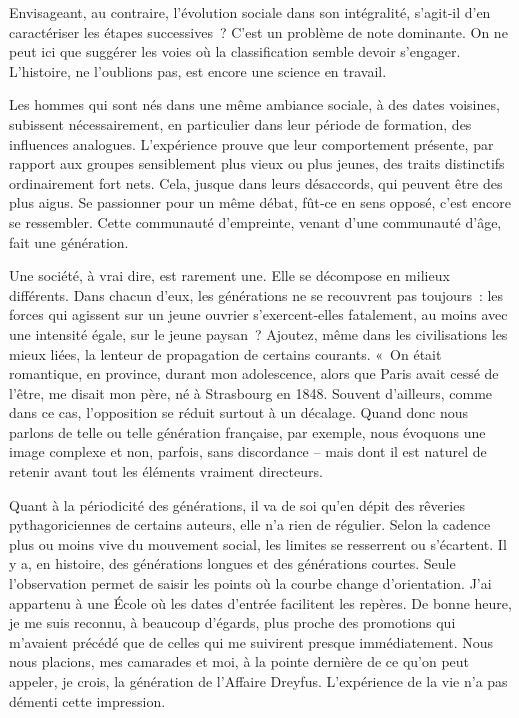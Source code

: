 \documentclass[french,twoside]{book} %
\begin{document}
\noindent Envisageant, au contraire, l’évolution sociale dans son intégralité, s’agit‑il d’en caractériser les étapes successives ? C’est un problème de note dominante. On ne peut ici que suggérer les voies où la classification semble devoir s’engager. L’histoire, ne l’oublions pas, est encore une science en travail.\par
Les hommes qui sont nés dans une même ambiance sociale, à des dates voisines, subissent nécessairement, en particulier dans leur période de formation, des influences analogues. L’expérience prouve que leur com­portement présente, par rapport aux groupes sensiblement plus vieux ou plus jeunes, des traits distinctifs ordinairement fort nets. Cela, jusque dans leurs désaccords, qui peuvent être des plus aigus. Se passionner pour un même débat, fût‑ce en sens opposé, c’est encore se ressembler. Cette communauté d’empreinte, venant d’une communauté d’âge, fait une génération.\par
\label{p95} Une société, à vrai dire, est rarement une. Elle se décompose en milieux différents. Dans chacun d’eux, les générations ne se recouvrent pas tou­jours : les forces qui agissent sur un jeune ouvrier s’exercent‑elles fatalement, au moins avec une intensité égale, sur le jeune paysan ? Ajou­tez, même dans les civilisations les mieux liées, la lenteur de propagation de certains courants. « On était romantique, en province, durant mon ado­lescence, alors que Paris avait cessé de l’être, me disait mon père, né à Strasbourg en 1848. Souvent d’ailleurs, comme dans ce cas, l’opposition se réduit surtout à un décalage. Quand donc nous parlons de telle ou telle génération française, par exemple, nous évoquons une image complexe et non, parfois, sans discordance – mais dont il est naturel de retenir avant tout les éléments vraiment directeurs.\par
Quant à la périodicité des générations, il va de soi qu’en dépit des rêveries pythagoriciennes de certains auteurs, elle n’a rien de régulier. Selon la cadence plus ou moins vive du mouvement social, les limites se resserrent ou s’écartent. Il y a, en histoire, des générations longues et des générations courtes. Seule l’observation permet de saisir les points où la courbe change d’orientation. J’ai appartenu à une École où les dates d’entrée facilitent les repères. De bonne heure, je me suis reconnu, à beaucoup d’égards, plus proche des promotions qui m’avaient précédé que de celles qui me suivirent presque immédiatement. Nous nous placions, mes camarades et moi, à la pointe dernière de ce qu’on peut appeler, je crois, la génération de l’Affaire Dreyfus. L’expérience de la vie n’a pas démenti cette impression.\par
\end{document}
